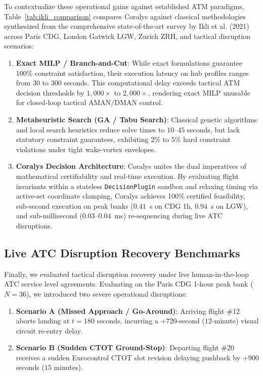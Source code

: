\documentclass[10pt,journal,compsoc]{IEEEtran}
\begin{document}
To contextualize these operational gains against established ATM paradigms, Table~\ref{tab:ikli_comparison} compares Coralys against classical methodologies synthesized from the comprehensive state-of-the-art survey by Ikli et al. (2021) \cite{ikli2021} across Paris CDG, London Gatwick LGW, Zurich ZRH, and tactical disruption scenarios:
\begin{enumerate}
    \item \textbf{Exact MILP / Branch-and-Cut}: While exact formulations guarantee 100\% constraint satisfaction, their execution latency on hub profiles ranges from $30$ to $300$ seconds. This computational delay exceeds tactical ATM decision thresholds by $1,000\times$ to $2,000\times$, rendering exact MILP unusable for closed-loop tactical AMAN/DMAN control.
    \item \textbf{Metaheuristic Search (GA / Tabu Search)}: Classical genetic algorithms and local search heuristics reduce solve times to $10$--$45$ seconds, but lack statutory constraint guarantees, exhibiting $2\%$ to $5\%$ hard constraint violations under tight wake-vortex envelopes.
    \item \textbf{Coralys Decision Architecture}: Coralys unites the dual imperatives of mathematical certifiability and real-time execution. By evaluating flight invariants within a stateless \texttt{DecisionPlugin} sandbox and relaxing timing via active-set coordinate clamping, Coralys achieves 100\% certified feasibility, sub-second execution on peak banks ($0.41$~s on CDG 1h, $0.94$~s on LGW), and sub-millisecond ($0.03$--$0.04$~ms) re-sequencing during live ATC disruptions.
\end{enumerate}

\subsection{Live ATC Disruption Recovery Benchmarks}
Finally, we evaluated tactical disruption recovery under live human-in-the-loop ATC service level agreements. Evaluating on the Paris CDG 1-hour peak bank ($N=36$), we introduced two severe operational disruptions:
\begin{enumerate}
    \item \textbf{Scenario A (Missed Approach / Go-Around)}: Arriving flight \#12 aborts landing at $t = 180$ seconds, incurring a $+720$-second ($12$-minute) visual circuit re-entry delay.
    \item \textbf{Scenario B (Sudden CTOT Ground-Stop)}: Departing flight \#20 receives a sudden Eurocontrol CTOT slot revision delaying pushback by $+900$ seconds ($15$ minutes).
\end{enumerate}
\end{document}
